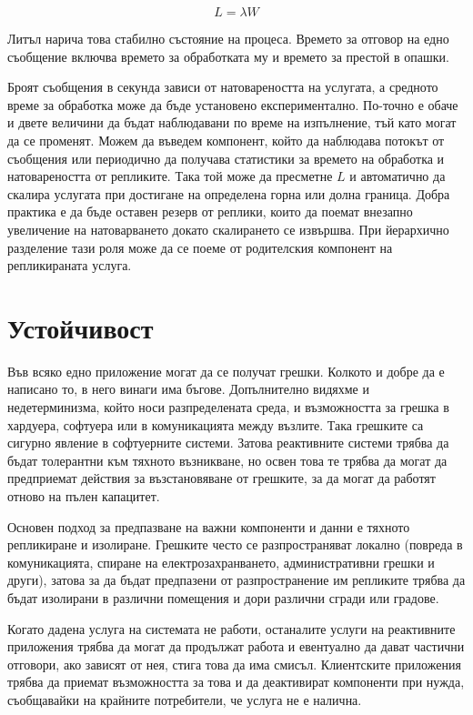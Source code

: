 \begin{equation}
L = \lambda W
\end{equation}

Литъл нарича това стабилно състояние на процеса. Времето за отговор на едно съобщение включва времето за обработката му и времето за престой в опашки.

Броят съобщения в секунда зависи от натовареността на услугата, а средното време за обработка може да бъде установено експериментално. По-точно е обаче и двете величини да бъдат наблюдавани по време на изпълнение, тъй като могат да се променят. Можем да въведем компонент, който да наблюдава потокът от съобщения или периодично да получава статистики за времето на обработка и натовареността от репликите. Така той може да пресметне $L$ и автоматично да скалира услугата при достигане на определена горна или долна граница. Добра практика е да бъде оставен резерв от реплики, които да поемат внезапно увеличение на натоварването докато скалирането се извършва. При йерархично разделение тази роля може да се поеме от родителския компонент на репликираната услуга.

\section{Устойчивост}

Във всяко едно приложение могат да се получат грешки. Колкото и добре да е написано то, в него винаги има бъгове. Допълнително видяхме и недетерминизма, който носи разпределената среда, и възможността за грешка в хардуера, софтуера или в комуникацията между възлите. Така грешките са сигурно явление в софтуерните системи. Затова реактивните системи трябва да бъдат толерантни към тяхното възникване, но освен това те трябва да могат да предприемат действия за възстановяване от грешките, за да могат да работят отново на пълен капацитет.

Основен подход за предпазване на важни компоненти и данни е тяхното репликиране и изолиране. Грешките често се разпространяват локално (повреда в комуникацията, спиране на електрозахранването, административни грешки и други), затова за да бъдат предпазени от разпространение им репликите трябва да бъдат изолирани в различни помещения и дори различни сгради или градове.

Когато дадена услуга на системата не работи, останалите услуги на реактивните приложения трябва да могат да продължат работа и евентуално да дават частични отговори, ако зависят от нея, стига това да има смисъл. Клиентските приложения трябва да приемат възможността за това и да деактивират компоненти при нужда, съобщавайки на крайните потребители, че услуга не е налична.

